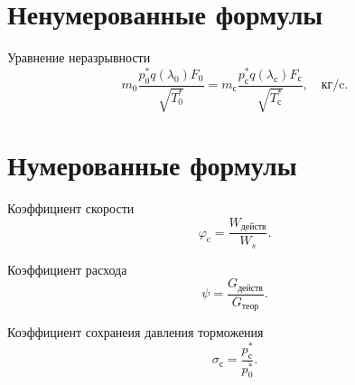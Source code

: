 \documentclass[a4paper, 12pt]{article}
\begin{document}
\section{Ненумерованные формулы}

Уравнение неразрывности
$$
m_0 \dfrac{p_0^*q(\lambda_0)F_0}{\sqrt{T_0^*}} = 
m_\text{с}\dfrac{p_\text{с}^*q(\lambda_\text{с})
F_\text{с}}{\sqrt{T_\text{с}^*}}, \quad\text{кг/c}.
$$

\section{Нумерованные формулы}


Коэффициент скорости
\begin{equation}
\varphi_\text{c} = \dfrac{W_\text{действ}}{W_s}.
\end{equation}

Коэффициент расхода
\begin{equation}
\psi = \dfrac{G_\text{действ}}{G_\text{теор}}.
\end{equation}

Коэффициент сохранеия давления торможения
\begin{equation}
\sigma_\text{с} = \dfrac{p_\text{с}^*}{p^*_0}.
\end{equation}
\end{document}
